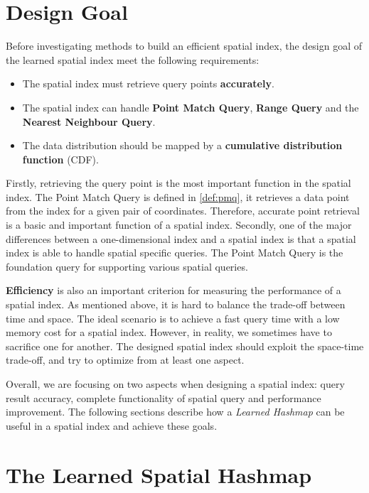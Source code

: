\section{Design Goal}

Before investigating methods to build an efficient spatial index, the design goal of the learned spatial index meet the following requirements:
\begin{itemize}
    \item The spatial index must retrieve query points \textbf{accurately}. 
    \item The spatial index can handle \textbf{Point Match Query}, \textbf{Range Query} and the \textbf{Nearest Neighbour Query}.
    \item The data distribution should be mapped by a \textbf{cumulative distribution function} (CDF). 
\end{itemize}


Firstly, retrieving the query point is the most important function in the spatial index. The Point Match Query is defined in \ref{def:pmq}, it retrieves a data point from the index for a given pair of coordinates. Therefore, accurate point retrieval is a basic and important function of a spatial index. Secondly, one of the major differences between a one-dimensional index and a spatial index is that a spatial index is able to handle spatial specific queries. The Point Match Query is the foundation query for supporting various spatial queries.


\textbf{Efficiency} is also an important criterion for measuring the performance of a spatial index. As mentioned above, it is hard to balance the trade-off between time and space. The ideal scenario is to achieve a fast query time with a low memory cost for a spatial index. However, in reality, we sometimes have to sacrifice one for another. The designed spatial index should exploit the space-time trade-off, and try to optimize from at least one aspect. 

Overall, we are focusing on two aspects when designing a spatial index: query result accuracy, complete functionality of spatial query and performance improvement. The following sections describe how a \textit{Learned Hashmap} can be useful in a spatial index and achieve these goals. 


\section{The Learned Spatial Hashmap}

